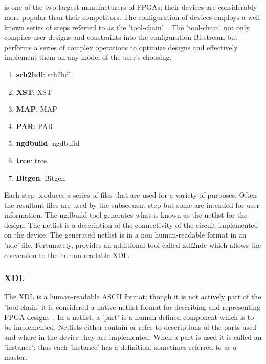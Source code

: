 \subsection{\Xilinx}
\Xilinx is one of the two largest manufacturers of \acrshort{FPGA}s; their devices are considerably more popular than their competitors.
The configuration of devices employs a well known series of steps referred to as the \Xilinx 'tool-chain'~\cite{xilnxDevManual}.
The 'tool-chain' not only compiles user designs and constraints into the configuration \gls{Bitstream} but performs a series of complex operations to optimize designs and effectively implement them on any \Xilinx model of the user's choosing.
\begin{enumerate}
	\item \textbf{\gls{sch2hdl}}: \glsdesc{sch2hdl}
	\item \textbf{\gls{XST}}: \glsdesc{XST}
	\item \textbf{\gls{MAP}}: \glsdesc{MAP}
	\item \textbf{\gls{PAR}}: \glsdesc{PAR}
	\item \textbf{\gls{ngdbuild}}: \glsdesc{ngdbuild}
	\item \textbf{\gls{trce}}: \glsdesc{trce}
	\item \textbf{\gls{Bitgen}}: \glsdesc{Bitgen}
\end{enumerate}
Each step produces a series of files that are used for a variety of purposes. 
Often the resultant files are used by the subsequent step but some are intended for user information.
The \gls{ngdbuild} tool generates what is known as the netlist for the design.
The netlist is a description of the connectivity of the circuit implemented on the device. 
The generated netlist is in a non human-readable format in an 'ndc' file.
Fortunately, \Xilinx provides an additional tool called \gls{xdl2ndc} which allows the conversion to the human-readable \acrfull{XDL}.
\subsubsection{\acrfull{XDL}} \label{sec:XDL}
The \acrfull{XDL} is a human-readable ASCII format; though it is not actively part of the 'tool-chain' it is considered a native netlist format for describing and representing \acrshort{FPGA} designs~\cite{xdlTutorial}. 
In a netlist, a 'part' is a human-defined component which is to be implemented.
Netlists either contain or refer to descriptions of the parts used and where in the device they are implemented.
When a part is used it is called an 'instance'; thus each 'instance' has a definition, sometimes referred to as a master.

